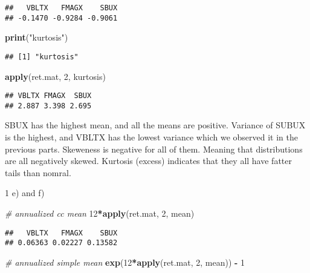 \documentclass[]{article}
\newenvironment{Shaded}{\begin{snugshade}}{\end{snugshade}}
\newcommand{\KeywordTok}[1]{\textcolor[rgb]{0.13,0.29,0.53}{\textbf{#1}}}
\newcommand{\DecValTok}[1]{\textcolor[rgb]{0.00,0.00,0.81}{#1}}
\newcommand{\StringTok}[1]{\textcolor[rgb]{0.31,0.60,0.02}{#1}}
\newcommand{\CommentTok}[1]{\textcolor[rgb]{0.56,0.35,0.01}{\textit{#1}}}
\newcommand{\OperatorTok}[1]{\textcolor[rgb]{0.81,0.36,0.00}{\textbf{#1}}}
\newcommand{\NormalTok}[1]{#1}
\begin{document}
\begin{verbatim}
##   VBLTX   FMAGX    SBUX 
## -0.1470 -0.9284 -0.9061
\end{verbatim}

\begin{Shaded}
\begin{Highlighting}[]
\KeywordTok{print}\NormalTok{(}\StringTok{"kurtosis"}\NormalTok{)}
\end{Highlighting}
\end{Shaded}

\begin{verbatim}
## [1] "kurtosis"
\end{verbatim}

\begin{Shaded}
\begin{Highlighting}[]
\KeywordTok{apply}\NormalTok{(ret.mat, }\DecValTok{2}\NormalTok{, kurtosis)}
\end{Highlighting}
\end{Shaded}

\begin{verbatim}
## VBLTX FMAGX  SBUX 
## 2.887 3.398 2.695
\end{verbatim}

SBUX has the highest mean, and all the means are positive. Variance of
SUBUX is the highest, and VBLTX has the lowest variance which we
observed it in the previous parts. Skeweness is negative for all of
them. Meaning that distributions are all negatively skewed. Kurtosis
(excess) indicates that they all have fatter tails than nomral.

1 e) and f)

\begin{Shaded}
\begin{Highlighting}[]
\CommentTok{# annualized cc mean }
\DecValTok{12}\OperatorTok{*}\KeywordTok{apply}\NormalTok{(ret.mat, }\DecValTok{2}\NormalTok{, mean)}
\end{Highlighting}
\end{Shaded}

\begin{verbatim}
##   VBLTX   FMAGX    SBUX 
## 0.06363 0.02227 0.13582
\end{verbatim}

\begin{Shaded}
\begin{Highlighting}[]
\CommentTok{# annualized simple mean}
\KeywordTok{exp}\NormalTok{(}\DecValTok{12}\OperatorTok{*}\KeywordTok{apply}\NormalTok{(ret.mat, }\DecValTok{2}\NormalTok{, mean)) }\OperatorTok{-}\StringTok{ }\DecValTok{1}
\end{Highlighting}
\end{Shaded}
\end{document}
